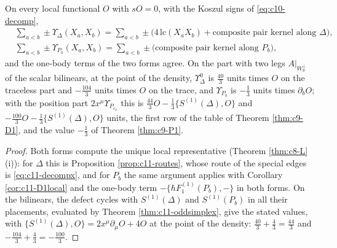 \begin{corollary}
\label{cor:c11-DPdefect}
On every local functional $O$ with $sO=0$, with the Koszul signs of \eqref{eq:c10-decomp},
\[
\begin{aligned}
&\sum_{a<b}\pm\Upsilon_\Delta(X_a,X_b)=\sum_{a<b}\pm\big(4\,\mathrm{lc}(X_aX_b)+\text{composite pair kernel along }\Delta\big),\\
&\sum_{a<b}\pm\Upsilon_{P_b}(X_a,X_b)=\sum_{a<b}\pm\big(\text{composite pair kernel along }P_b\big),
\end{aligned}
\]
and the one-body terms of the two forms agree. On the part with two legs $A|_{W_{\mathbb R}^\perp}$ of the scalar bilinears, at the point of the density, $\Upsilon^0_\Delta$ is $\tfrac{40}3$ units times $O$ on the traceless part and $-\tfrac{104}3$ units times $O$ on the trace, and $\Upsilon_{P_b}$ is $-\tfrac13$ units times $\partial_bO$; with the position part $2x^\mu\Upsilon_{P_{e_\mu}}$ this is $\tfrac{44}3O-\tfrac13\{S^{(1)}(\Delta),O\}$ and $-\tfrac{100}3O-\tfrac13\{S^{(1)}(\Delta),O\}$ units, the first row of the table of Theorem \ref{thm:c9-D1}, and the value $-\tfrac13$ of Theorem \ref{thm:c9-P1}.
\end{corollary}

\begin{proof}
Both forms compute the unique local representative (Theorem \ref{thm:c8-L} (i)): for $\Delta$ this is Proposition \ref{prop:c11-routes}, whose route of the special edges is \eqref{eq:c11-decompx}, and for $P_b$ the same argument applies with Corollary \ref{cor:c11-D1local} and the one-body term $-\{\hbar F_1^{(1)}(P_b),-\}$ in both forms. On the bilinears, the defect cycles with $S^{(1)}(\Delta)$ and $S^{(1)}(P_b)$ in all their placements, evaluated by Theorem \ref{thm:c11-oddsimplex}, give the stated values, with $\{S^{(1)}(\Delta),O\}=2x^\mu\partial_\mu O+4O$ at the point of the density: $\tfrac{40}3+\tfrac43=\tfrac{44}3$ and $-\tfrac{104}3+\tfrac43=-\tfrac{100}3$.
\end{proof}

